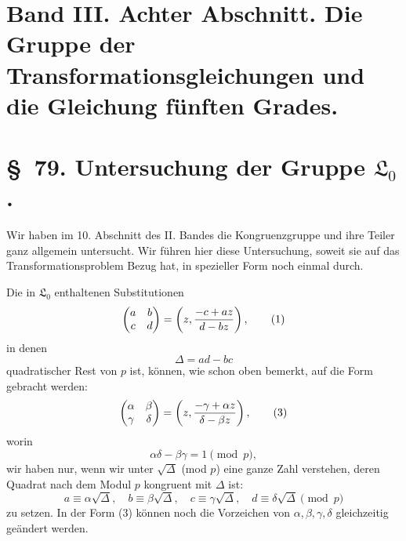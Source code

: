 \documentclass[11pt]{article}
\newcommand{\Lzero}{\mathfrak L_0}
\begin{document}
\clearpage
\section*{Band III. Achter Abschnitt. Die Gruppe der Transformationsgleichungen und die Gleichung fünften Grades.}

\section*{\S~79. Untersuchung der Gruppe $\Lzero$.}

Wir haben im 10. Abschnitt des II. Bandes die Kongruenzgruppe und ihre Teiler ganz allgemein untersucht. Wir führen hier diese Untersuchung, soweit sie auf das Transformationsproblem Bezug hat, in spezieller Form noch einmal durch.

Die in $\Lzero$ enthaltenen Substitutionen
\begin{equation}
 \begin{pmatrix}a&b\\ c&d\end{pmatrix}
 =\left(z,{ -c+az\over d-bz}\right),
\tag{1}
\end{equation}
in denen
\begin{equation}
 \Delta=ad-bc
\tag{2}
\end{equation}
quadratischer Rest von $p$ ist, können, wie schon oben bemerkt, auf die Form gebracht werden:
\begin{equation}
 \begin{pmatrix}\alpha&\beta\\ \gamma&\delta\end{pmatrix}
 =\left(z,{ -\gamma+\alpha z\over \delta-\beta z}\right),
\tag{3}
\end{equation}
worin
\begin{equation}
 \alpha\delta-\beta\gamma=1\pmod p,
\tag{4}
\end{equation}
wir haben nur, wenn wir unter $\sqrt\Delta$ (mod $p$) eine ganze Zahl verstehen, deren Quadrat nach dem Modul $p$ kongruent mit $\Delta$ ist:
\[
 a\equiv \alpha\sqrt\Delta,
 \quad b\equiv\beta\sqrt\Delta,
 \quad c\equiv\gamma\sqrt\Delta,
 \quad d\equiv\delta\sqrt\Delta\pmod p
\]
zu setzen. In der Form (3) können noch die Vorzeichen von $\alpha,\beta,\gamma,\delta$ gleichzeitig geändert werden.
\end{document}

